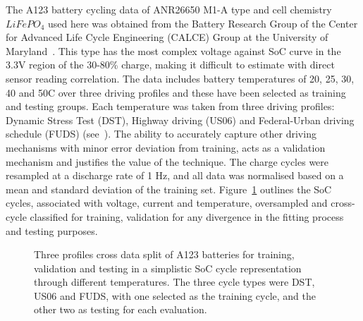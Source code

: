 %
%
{The A123 battery cycling data of ANR26650 M1-A type and cell chemistry $LiFePO_4$ used here was obtained from the Battery Research Group of the Center for Advanced Life Cycle Engineering (CALCE) Group at the University of Maryland~\cite{noauthor_calce_2017}.}
This type has the most complex voltage against SoC curve in the 3.3V region of the 30-80\% charge, making it difficult to estimate with direct sensor reading correlation.
The data includes battery temperatures of 20, 25, 30, 40 and 50\textdegree{}C over three driving profiles and these have been selected as training and testing groups.
Each temperature was taken from three driving profiles: Dynamic Stress Test (DST), Highway driving (US06) and Federal-Urban driving schedule (FUDS) (see~\cite{castillo_18_2015}).
The ability to accurately capture other driving mechanisms with minor error deviation from training, acts as a validation mechanism and justifies the value of the technique.
The charge cycles were resampled at a discharge rate of 1 Hz, and all data was normalised based on a mean and standard deviation of the training set.
Figure~\ref{fig:cross-data} outlines the SoC cycles, associated with voltage, current and temperature, oversampled and cross-cycle classified for training, validation for any divergence in the fitting process and testing purposes.
\begin{figure}[ht]
    \centering
    
    \caption{Three profiles cross data split of A123 batteries for training, validation and testing in a simplistic SoC cycle representation through different temperatures. The three cycle types were DST, US06 and FUDS, with one selected as the training cycle, and the other two as testing for each evaluation.}
    \label{fig:cross-data}
\end{figure}

